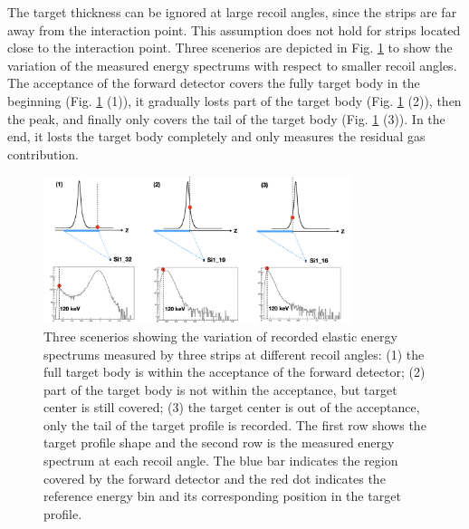 \documentclass[fleqn,twocolumn,a4paper]{ikpar}
\begin{document}
The target thickness can be ignored at large recoil angles, since the strips are
far away from the interaction point.
This assumption does not hold for strips located close to the interaction point.
Three scenerios are depicted in Fig. \ref{fig:target_density_determination} to
show the variation of the measured energy spectrums with respect to smaller
recoil angles.
The acceptance of the forward detector covers the fully target body in the
beginning (Fig. \ref{fig:target_density_determination} (1)), it gradually losts part of the target body
(Fig. \ref{fig:target_density_determination} (2)), then the peak, and finally only covers
the tail of the target body (Fig. \ref{fig:target_density_determination} (3)).
In the end, it losts the target body completely and only measures the residual
gas contribution.
\begin{figure}[h!]
  \centering
	\includegraphics[width=0.8\textwidth]{./target_density_determination.png}
  \caption{Three scenerios showing the variation of recorded elastic energy
    spectrums measured by three strips at different recoil angles: (1) the full
    target body is within the acceptance of the
    forward detector; (2) part of the target body is not within the
    acceptance, but target center is still covered; (3) the target center is out of the
    acceptance, only the tail of the target profile is recorded. The first row
    shows the target profile shape and the second row is the measured energy
    spectrum at each recoil angle. The blue bar indicates the region covered by
    the forward detector and the red dot indicates the reference energy bin and
    its corresponding position in the target profile.}
  \label{fig:target_density_determination}
\end{figure}
\end{document}
